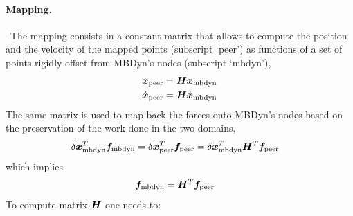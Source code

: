 \paragraph{Mapping.} \
The mapping consists in a constant matrix that allows to compute
the position and the velocity of the mapped points (subscript `peer')
as functions of a set of points rigidly offset from MBDyn's nodes
(subscript `mbdyn'),
\begin{subequations}
\begin{align}
	\boldsymbol{x}_\text{peer}
	&=
	\boldsymbol{H} \boldsymbol{x}_\text{mbdyn}
	\\
	\dot{\boldsymbol{x}}_\text{peer}
	&=
	\boldsymbol{H} \dot{\boldsymbol{x}}_\text{mbdyn}
\end{align}
\end{subequations}
The same matrix is used to map back the forces onto MBDyn's nodes
based on the preservation of the work done in the two domains,
\begin{align}
	\delta\boldsymbol{x}_\text{mbdyn}^T \boldsymbol{f}_\text{mbdyn}
	&=
	\delta\boldsymbol{x}_\text{peer}^T \boldsymbol{f}_\text{peer}
	=
	\delta\boldsymbol{x}_\text{mbdyn}^T \boldsymbol{H}^T \boldsymbol{f}_\text{peer}
\end{align}
which implies
\begin{align}
	\boldsymbol{f}_\text{mbdyn}
	&=
	\boldsymbol{H}^T \boldsymbol{f}_\text{peer}
\end{align}
To compute matrix $\boldsymbol{H}$ one needs to:
